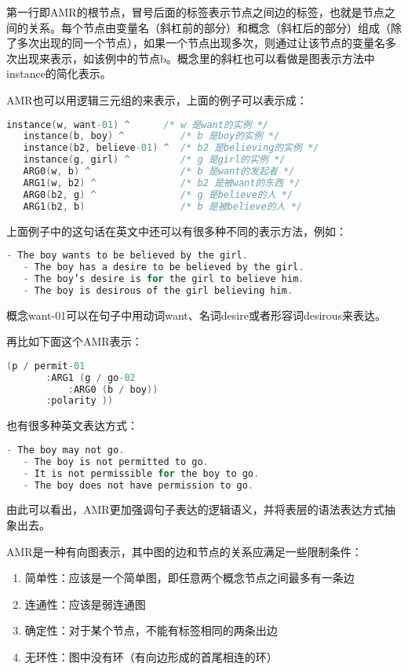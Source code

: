 \documentclass[master, winfont]{njuthesis}
\begin{document}
第一行即AMR的根节点，冒号后面的标签表示节点之间边的标签，也就是节点之间的关系。每个节点由变量名（斜杠前的部分）和概念（斜杠后的部分）组成（除了多次出现的同一个节点），如果一个节点出现多次，则通过让该节点的变量名多次出现来表示，如该例中的节点b。概念里的斜杠也可以看做是图表示方法中instance的简化表示。

AMR也可以用逻辑三元组的来表示，上面的例子可以表示成：
\begin{lstlisting}[language=C]
   instance(w, want-01) ^      /* w 是want的实例 */ 
   instance(b, boy) ^          /* b 是boy的实例 */ 
   instance(b2, believe-01) ^  /* b2 是believing的实例 */ 
   instance(g, girl) ^         /* g 是girl的实例 */ 
   ARG0(w, b) ^                /* b 是want的发起者 */ 
   ARG1(w, b2) ^               /* b2 是被want的东西 */ 
   ARG0(b2, g) ^               /* g 是believe的人 */ 
   ARG1(b2, b)                 /* b 是被believe的人 */
\end{lstlisting}

上面例子中的这句话在英文中还可以有很多种不同的表示方法，例如：
\begin{lstlisting}[language=C]
   - The boy wants to be believed by the girl.
   - The boy has a desire to be believed by the girl.
   - The boy’s desire is for the girl to believe him.
   - The boy is desirous of the girl believing him.
\end{lstlisting}

概念want-01可以在句子中用动词want、名词desire或者形容词desirous来表达。

再比如下面这个AMR表示：
\begin{lstlisting}[language=C]
   (p / permit-01
       :ARG1 (g / go-02
           :ARG0 (b / boy))
       :polarity ))
\end{lstlisting}

也有很多种英文表达方式：
\begin{lstlisting}[language=C]
   - The boy may not go.
   - The boy is not permitted to go.
   - It is not permissible for the boy to go.
   - The boy does not have permission to go.
\end{lstlisting}

由此可以看出，AMR更加强调句子表达的逻辑语义，并将表层的语法表达方式抽象出去。

AMR是一种有向图表示，其中图的边和节点的关系应满足一些限制条件\cite{Flanigan2014}：
\begin{enumerate}
  \item 简单性：应该是一个简单图，即任意两个概念节点之间最多有一条边
  \item 连通性：应该是弱连通图
  \item 确定性：对于某个节点，不能有标签相同的两条出边
  \item 无环性：图中没有环（有向边形成的首尾相连的环）
\end{enumerate}
\end{document}
